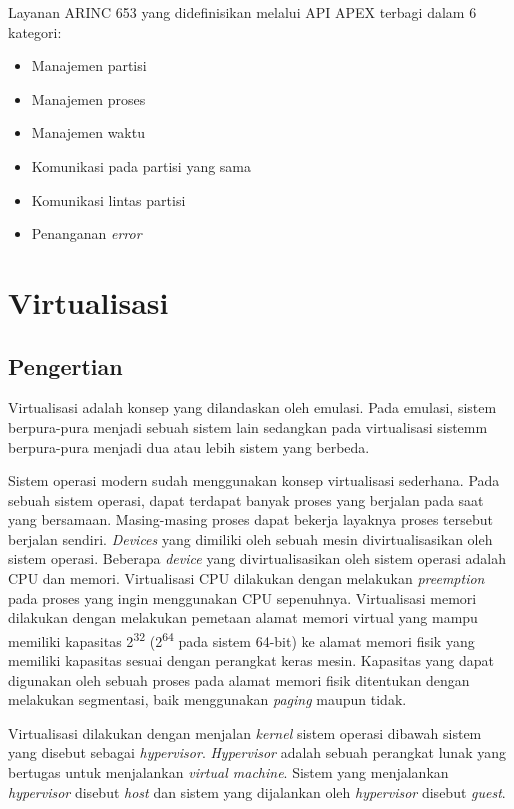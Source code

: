 Layanan ARINC 653 yang didefinisikan melalui API APEX terbagi dalam 6 kategori:
\begin{itemize}
    \item Manajemen partisi
    \item Manajemen proses
    \item Manajemen waktu
    \item Komunikasi pada partisi yang sama
    \item Komunikasi lintas partisi
    \item Penanganan \textit{error}
\end{itemize}


\section{Virtualisasi}

\subsection{Pengertian}

Virtualisasi adalah konsep yang dilandaskan oleh emulasi. Pada emulasi, sistem berpura-pura menjadi sebuah sistem lain
sedangkan pada virtualisasi sistemm berpura-pura menjadi dua atau lebih sistem yang berbeda.

Sistem operasi modern sudah menggunakan konsep virtualisasi sederhana. Pada sebuah sistem operasi, dapat terdapat banyak
proses yang berjalan pada saat yang bersamaan. Masing-masing proses dapat bekerja layaknya proses tersebut berjalan
sendiri. \textit{Devices} yang dimiliki oleh sebuah mesin divirtualisasikan oleh sistem operasi. Beberapa
\textit{device} yang divirtualisasikan oleh sistem operasi adalah CPU dan memori. Virtualisasi CPU dilakukan dengan
melakukan \textit{preemption} pada proses yang ingin menggunakan CPU sepenuhnya. Virtualisasi memori dilakukan dengan
melakukan pemetaan alamat memori virtual yang mampu memiliki kapasitas 2\textsuperscript{32} (2\textsuperscript{64} pada
sistem 64-bit) ke alamat memori fisik yang memiliki kapasitas sesuai dengan perangkat keras mesin.  Kapasitas yang dapat
digunakan oleh sebuah proses pada alamat memori fisik ditentukan dengan melakukan segmentasi, baik menggunakan
\textit{paging} maupun tidak.

Virtualisasi dilakukan dengan menjalan \textit{kernel} sistem operasi dibawah sistem yang disebut sebagai
\textit{hypervisor}. \textit{Hypervisor} adalah sebuah perangkat lunak yang bertugas untuk menjalankan \textit{virtual
machine}. Sistem yang menjalankan \textit{hypervisor} disebut \textit{host} dan sistem yang dijalankan oleh
\textit{hypervisor} disebut \textit{guest}.

